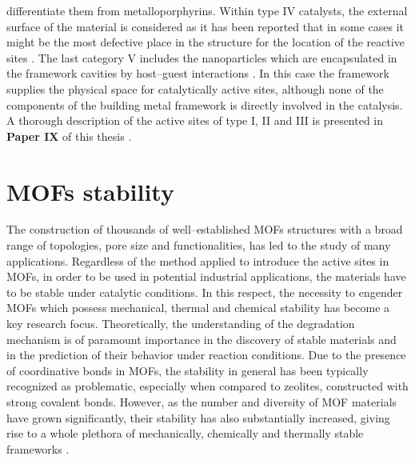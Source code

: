 differentiate them from metalloporphyrins.
Within type IV catalysts, the external surface of the material is considered as
it has been reported that in some cases it might be the most defective place in
the structure for the location of the reactive sites \cite{Chizallet2010a,
Chizallet2010b}. The last category V includes the nanoparticles which are encapsulated in the
framework cavities by host--guest interactions \cite{Dhakshinamoorthy2012,
Juan-Alcaniz2013}. In this case the framework supplies the physical space for
catalytically active sites, although none of the components of the building
metal framework is directly involved in the catalysis. A thorough description of
the active sites of type I, II and III is presented in \textbf{Paper IX} of this
thesis \cite{Rogge2017}.


\section{MOFs stability}
The construction of thousands of well--established MOFs structures with a
broad range of topologies, pore size and functionalities, has led to
the study of many applications. Regardless of the method applied to introduce
the active sites in MOFs, in order to be used in potential industrial applications, the materials
have to be stable under catalytic conditions.
In this respect, the necessity to
engender MOFs which possess mechanical, thermal and chemical stability
has become a key research focus. Theoretically, the understanding
of the degradation mechanism is of paramount importance in the discovery of
stable materials and in the prediction of their behavior under reaction
conditions.
Due to the presence of coordinative bonds in MOFs, the stability in general has been typically recognized as problematic, especially
when compared to zeolites, constructed with strong covalent bonds. However, as
the number and diversity of MOF materials have grown significantly, their stability has also
substantially increased, giving rise to a whole plethora of
mechanically, chemically and thermally stable frameworks \cite{Howarth2016}.
\newpage
